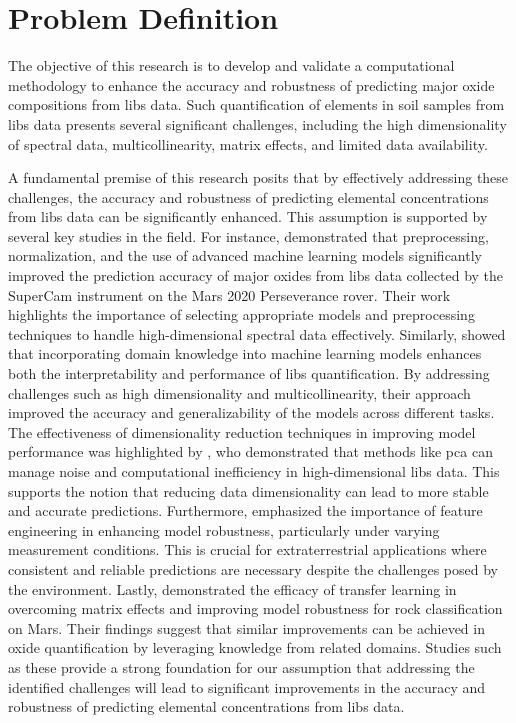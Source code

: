 \section{Problem Definition}\label{sec:problem_definition}
The objective of this research is to develop and validate a computational methodology to enhance the accuracy and robustness of predicting major oxide compositions from \gls{libs} data.
Such quantification of elements in soil samples from \gls{libs} data presents several significant challenges, including the high dimensionality of spectral data, multicollinearity, matrix effects, and limited data availability.

A fundamental premise of this research posits that by effectively addressing these challenges, the accuracy and robustness of predicting elemental concentrations from \gls{libs} data can be significantly enhanced. This assumption is supported by several key studies in the field.
For instance, \citet{andersonPostlandingMajorElement2022} demonstrated that preprocessing, normalization, and the use of advanced machine learning models significantly improved the prediction accuracy of major oxides from \gls{libs} data collected by the SuperCam instrument on the Mars 2020 Perseverance rover. Their work highlights the importance of selecting appropriate models and preprocessing techniques to handle high-dimensional spectral data effectively.
Similarly, \citet{song_DF-K-ELM} showed that incorporating domain knowledge into machine learning models enhances both the interpretability and performance of \gls{libs} quantification. By addressing challenges such as high dimensionality and multicollinearity, their approach improved the accuracy and generalizability of the models across different tasks.
The effectiveness of dimensionality reduction techniques in improving model performance was highlighted by \citet{rezaei_dimensionality_reduction}, who demonstrated that methods like \gls{pca} can manage noise and computational inefficiency in high-dimensional \gls{libs} data. This supports the notion that reducing data dimensionality can lead to more stable and accurate predictions.
Furthermore, \citet{jeonEffectsFeatureEngineering2024} emphasized the importance of feature engineering in enhancing model robustness, particularly under varying measurement conditions. This is crucial for extraterrestrial applications where consistent and reliable predictions are necessary despite the challenges posed by the environment.
Lastly, \citet{sunMachineLearningTransfer2021} demonstrated the efficacy of transfer learning in overcoming matrix effects and improving model robustness for rock classification on Mars. Their findings suggest that similar improvements can be achieved in oxide quantification by leveraging knowledge from related domains.
Studies such as these provide a strong foundation for our assumption that addressing the identified challenges will lead to significant improvements in the accuracy and robustness of predicting elemental concentrations from \gls{libs} data.

